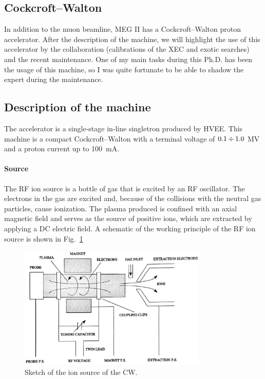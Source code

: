 \begin{refsection}
\section{Cockcroft–Walton}
    \label{sec:cw:calib}
    In addition to the muon beamline, MEG II has a Cockcroft–Walton proton accelerator. 
    After the description of the machine, we will highlight the use of this accelerator by the collaboration (calibrations of the XEC and exotic searches) and the recent maintenance.
    One of my main tasks during this Ph.D. has been the usage of this machine, so I was quite fortunate to be able to shadow the expert during the maintenance.

    \subsection{Description of the machine}
        \label{sec:cw:machine}
        The accelerator is a single-stage in-line singletron produced by HVEE. 
        This machine is a compact Cockcroft–Walton with a terminal voltage of $0.1\divisionsymbol1.0$ MV and a proton current up to \SI{100}{mA}.
        
        \paragraph{Source} The RF ion source is a bottle of gas that is excited by an RF oscillator. 
        The electrons in the gas are excited and, because of the collisions with the neutral gas particles, cause ionization.
        The plasma produced is confined with an axial magnetic field and serves as the source of positive ions, which are extracted by applying a DC electric field.
        A schematic of the working principle of the RF ion source is shown in Fig.~\ref{fig:CW:sketch:ionsource}

       \begin{figure}
            \centering
            \includegraphics[width=0.8\textwidth]{Figures/MEG/CW/cw_ionsource.jpeg}
            \caption{Sketch of the ion source of the CW.}
            \label{fig:CW:sketch:ionsource}
        \end{figure}
        

\end{refsection}
